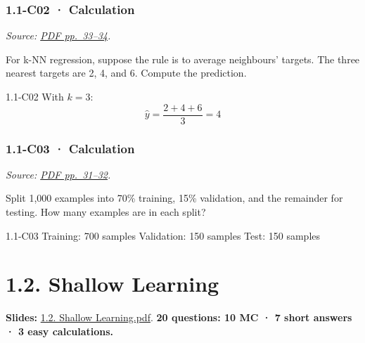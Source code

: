 \noindent\begin{minipage}{\linewidth}

\subsubsection{1.1-C02 · Calculation}\label{c02-calculation}

\emph{Source:
\href{../Lecture\%20Slides/1.1.\%20Fundamentals.pdf\#page=33}{PDF
pp.~33--34}.}

For k-NN regression, suppose the rule is to average neighbours' targets.
The three nearest targets are 2, 4, and 6. Compute the prediction.

\begin{solution}[26mm]{1.1-C02}
With \(k=3\):
\[
\hat y=\frac{2+4+6}{3}=\boxed{4}
\]
\end{solution}
\end{minipage}\par\medskip

\noindent\begin{minipage}{\linewidth}

\subsubsection{1.1-C03 · Calculation}\label{c03-calculation}

\emph{Source:
\href{../Lecture\%20Slides/1.1.\%20Fundamentals.pdf\#page=31}{PDF
pp.~31--32}.}

Split 1,000 examples into 70\% training, 15\% validation, and the
remainder for testing. How many examples are in each split?

\begin{solution}[26mm]{1.1-C03}
Training: 700 samples
Validation: 150 samples
Test: 150 samples
\end{solution}
\end{minipage}\par\medskip

\clearpage

\section{1.2. Shallow Learning}\label{shallow-learning}

\textbf{Slides:}
\href{../Lecture\%20Slides/1.2.\%20Shallow\%20Learning.pdf}{1.2. Shallow
Learning.pdf}. \textbf{20 questions: 10 MC · 7 short answers · 3 easy
calculations.}

